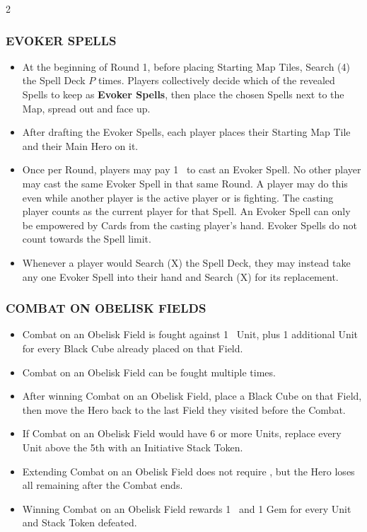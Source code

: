 \begin{multicols}{2}
\subsubsection*{\MakeUppercase{Evoker Spells}}
\begin{itemize}
  \item At the beginning of Round 1, before placing Starting Map Tiles, Search (4) the Spell Deck $P$ times. Players collectively decide which of the revealed Spells to keep as \textbf{Evoker Spells}, then place the chosen Spells next to the Map, spread out and face up.
  \item After drafting the Evoker Spells, each player places their Starting Map Tile and their Main Hero on it.
  \item Once per Round, players may pay 1~ to cast an Evoker Spell.
    No other player may cast the same Evoker Spell in that same Round.
    A player may do this even while another player is the active player or is fighting.
    The casting player counts as the current player for that Spell.
    An Evoker Spell can only be empowered by Cards from the casting player's hand.
    Evoker Spells do not count towards the Spell limit.
  \item Whenever a player would Search (X) the Spell Deck, they may instead take any one Evoker Spell into their hand and Search (X) for its replacement.
\end{itemize}

\subsubsection*{\MakeUppercase{Combat on Obelisk Fields}}
\begin{itemize}
  \item Combat on an Obelisk Field is fought against 1~ Unit, plus 1 additional  Unit for every Black Cube already placed on that Field.
  \item Combat on an Obelisk Field can be fought multiple times.
  \item After winning Combat on an Obelisk Field, place a Black Cube on that Field, then move the Hero back to the last Field they visited before the Combat.
  \item If Combat on an Obelisk Field would have 6 or more Units, replace every Unit above the 5th with an Initiative Stack Token.
  \item Extending Combat on an Obelisk Field does not require , but the Hero loses all remaining  after the Combat ends.
  \item Winning Combat on an Obelisk Field rewards 1~ and 1 Gem for every Unit and Stack Token defeated.
\end{itemize}


\end{multicols}
